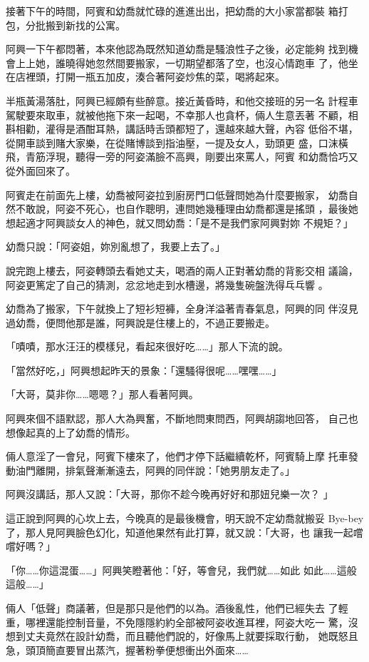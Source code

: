 接著下午的時間，阿賓和幼喬就忙碌的進進出出，把幼喬的大小家當都裝
箱打包，分批搬到新找的公寓。

阿興一下午都悶著，本來他認為既然知道幼喬是騷浪性子之後，必定能夠
找到機會上上她，誰曉得她忽然間要搬家，一切期望都落了空，也沒心情跑車
了，他坐在店裡頭，打開一瓶五加皮，湊合著阿姿炒焦的菜，喝將起來。

半瓶黃湯落肚，阿興已經頗有些醉意。接近黃昏時，和他交接班的另一名
計程車駕駛要來取車，就被他拖下來一起喝，不幸那人也貪杯，倆人生意丟著
不顧，相斟相勸，灌得是酒酣耳熱，講話時舌頭都短了，還越來越大聲，內容
低俗不堪，從開車談到賭大家樂，在從賭博談到指油壓，一提及女人，勁頭更
盛，口沫橫飛，青筋浮現，聽得一旁的阿姿滿臉不高興，剛要出來罵人，阿賓
和幼喬恰巧又從外面回來了。

阿賓走在前面先上樓，幼喬被阿姿拉到廚房門口低聲問她為什麼要搬家，
幼喬自然不敢說，阿姿不死心，也自作聰明，連問她幾種理由幼喬都還是搖頭
，最後她想起適才阿興談女人的神色，就又問幼喬：「是不是我們家阿興對妳
不規矩？」

幼喬只說：「阿姿姐，妳別亂想了，我要上去了。」

說完跑上樓去，阿姿轉頭去看她丈夫，喝酒的兩人正對著幼喬的背影交相
議論，阿姿更篤定了自己的猜測，忿忿地走到水槽邊，將幾隻碗盤洗得乓乓響
。

幼喬為了搬家，下午就換上了短衫短褲，全身洋溢著青春氣息，阿興的同
伴沒見過幼喬，便問他那是誰，阿興說是住樓上的，不過正要搬走。

「嘖嘖，那水汪汪的模樣兒，看起來很好吃……」那人下流的說。

「當然好吃，」阿興想起昨天的景象：「還騷得很呢……嘿嘿……」

「大哥，莫非你……嗯嗯？」那人看著阿興。

阿興來個不語默認，那人大為興奮，不斷地問東問西，阿興胡謅地回答，
自己也想像起真的上了幼喬的情形。

倆人意淫了一會兒，阿賓下樓來了，他們才停下話繼續乾杯，阿賓騎上摩
托車發動油門離開，排氣聲漸漸遠去，阿興的同伴說：「她男朋友走了。」

阿興沒講話，那人又說：「大哥，那你不趁今晚再好好和那妞兒樂一次？
」

這正說到阿興的心坎上去，今晚真的是最後機會，明天說不定幼喬就搬妥
Bye-bey了，那人見阿興臉色幻化，知道他果然有此打算，就又說：「大哥，也
讓我一起嚐嚐好嗎？」

「你……你這混蛋……」阿興笑瞪著他：「好，等會兒，我們就……如此
如此……這般這般……」

倆人「低聲」商議著，但是那只是他們的以為。酒後亂性，他們已經失去
了輕重，哪裡還能控制音量，不免隱隱約約全部被阿姿收進耳裡，阿姿大吃一
驚，沒想到丈夫竟然在設計幼喬，而且聽他們說的，好像馬上就要採取行動，
她既怒且急，頭頂簡直要冒出蒸汽，握著粉拳便想衝出外面來……

